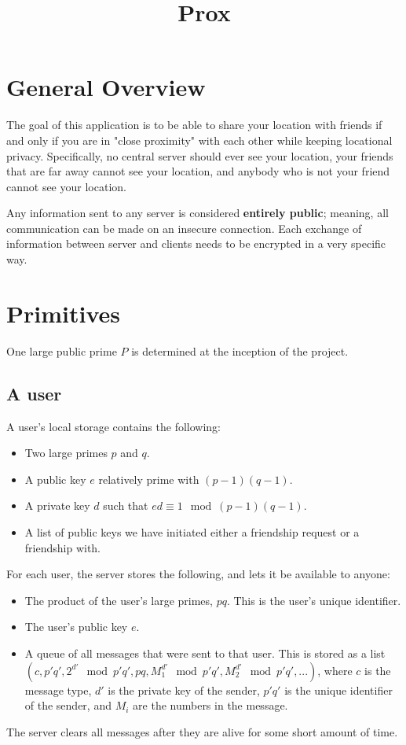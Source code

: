 \documentclass{article}
\begin{document}
\title{Prox}
\maketitle

\section{General Overview}
The goal of this application is to be able to share your location with friends if and only if you are in "close proximity" with each other while keeping locational privacy. Specifically, no central server should ever see your location, your friends that are far away cannot see your location, and anybody who is not your friend cannot see your location.

Any information sent to any server is considered \textbf{entirely public}; meaning, all communication can be made on an insecure connection. Each exchange of information between server and clients needs to be encrypted in a very specific way.

\section{Primitives}
One large public prime $P$ is determined at the inception of the project.

\subsection{A user}
A user's local storage contains the following:

\begin{itemize}
    \item Two large primes $p$ and $q$.
    \item A public key $e$ relatively prime with $(p-1)(q-1)$.
    \item A private key $d$ such that $ed \equiv 1 \mod{(p-1)(q-1)}$.
    \item A list of public keys we have initiated either a friendship request or a friendship with. 
\end{itemize}

\noindent For each user, the server stores the following, and lets it be available to anyone:
\begin{itemize}
    \item The product of the user's large primes, $pq$. This is the user's unique identifier.
    \item The user's public key $e$.
    \item A queue of all messages that were sent to that user. This is stored as a list $(c, p'q',2^{d'} \mod p'q', pq, M_1^{d'} \mod{p'q'},M_2^{d'} \mod{p'q'},...)$, where $c$ is the message type, $d'$ is the private key of the sender, $p'q'$ is the unique identifier of the sender, and $M_i$ are the numbers in the message.
\end{itemize}
\noindent The server clears all messages after they are alive for some short amount of time.
\end{document}
